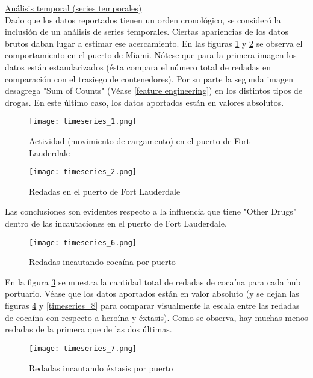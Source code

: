 \documentclass[12pt]{article}
\begin{document}
		\underline{Análisis temporal (series temporales)}\\
		Dado que los datos reportados tienen un orden cronológico, se consideró la inclusión de un análisis de series temporales. Ciertas apariencias de los datos brutos daban lugar a estimar ese acercamiento. En las figuras \ref{timeseries_1} y \ref{timeseries_2} se observa el comportamiento en el puerto de Miami. Nótese que para la primera imagen los datos están estandarizados (ésta compara el número total de redadas en comparación con el trasiego de contenedores). Por su parte la segunda imagen desagrega "Sum of Counts" (Véase \ref{feature engineering}) en los distintos tipos de drogas. En este último caso, los datos aportados están en valores absolutos.
		\begin{figure}[H]
			\caption{\label{timeseries_1} Actividad (movimiento de cargamento) en el puerto de Fort Lauderdale}
			\centering
			\hspace*{1cm}
			\texttt{[image: timeseries\_1.png]}
		\end{figure}
	
		\begin{figure}[H]
			\caption{\label{timeseries_2} Redadas en el puerto de Fort Lauderdale}
			\centering
			\hspace*{1cm}
			\texttt{[image: timeseries\_2.png]}
		\end{figure}
	
		Las conclusiones son evidentes respecto a la influencia que tiene "Other Drugs" dentro de las incautaciones en el puerto de Fort Lauderdale.
	
		\begin{figure}[H]
			\caption{\label{timeseries_6} Redadas incautando cocaína por puerto}
			\centering
			\hspace*{1cm}
			\texttt{[image: timeseries\_6.png]}
		\end{figure}
	
		En la figura \ref{timeseries_6} se muestra la cantidad total de redadas de cocaína para cada hub portuario. Véase que los datos aportados están en valor absoluto (y se dejan las figuras \ref{timeseries_7} y  \ref{timeseries_8} para comparar visualmente la escala entre las redadas de cocaína con respecto a heroína y éxtasis). Como se observa, hay muchas menos redadas de la primera que de las dos últimas.
		
		\begin{figure}[H]
			\caption{\label{timeseries_7} Redadas incautando éxtasis por puerto}
			\centering
			\hspace*{1cm}
			\texttt{[image: timeseries\_7.png]}
		\end{figure}
	
\end{document}
